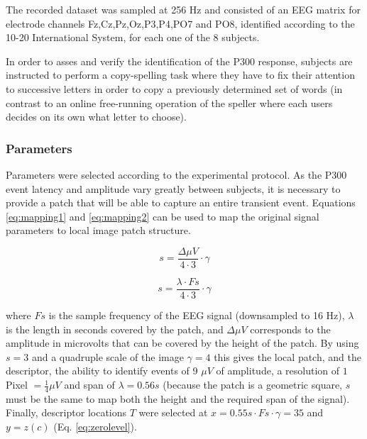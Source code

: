 \documentclass[entropy,article,submit,moreauthors,pdftex,10pt,a4paper]{mdpi}
\begin{document}
The recorded dataset was sampled at 256 Hz and consisted of an EEG matrix for electrode channels Fz,Cz,Pz,Oz,P3,P4,PO7 and PO8, identified according to the 10-20 International System,  for each one of the 8 subjects.  

In order to asses and verify the identification of the P300 response, subjects are instructed to perform a copy-spelling task where they have to fix their attention to successive letters in order to copy a previously determined set of words (in contrast to an online free-running operation of the speller where each users decides on its own what letter to choose).

\subsubsection{Parameters}

Parameters were selected according to the experimental protocol. As the P300 event latency and amplitude vary greatly between subjects, it is necessary to provide a patch that will be able to capture an entire transient event.  Equations \ref{eq:mapping1} and \ref{eq:mapping2} can be used to map the original signal parameters to local image patch structure. 

\begin{equation}
s= \frac{\Delta \mu V}{4 \cdot 3} \cdot \gamma 
\label{eq:mapping1}
\end{equation}

\begin{equation}
s = \frac{\lambda \cdot Fs}{4 \cdot 3} \cdot \gamma
\label{eq:mapping2}
\end{equation}

\noindent where $ Fs $ is the sample frequency of the EEG signal (downsampled to 16 Hz), $ \lambda $ is the length in seconds covered by the patch, and $\Delta  \mu V $ corresponds to the amplitude in microvolts that can be covered by the height of the patch. By using $ s = 3 $ and a quadruple scale of the image $ \gamma = 4 $ this gives the local patch, and the descriptor, the ability to identify events of 9 $ \mu V $ of amplitude, a resolution of $ 1 $ Pixel $ = \frac{1}{4} \mu V $ and span   of $ \lambda = 0.56 s $ (because the patch is a geometric square, $ s $ must be the same to map both the height and the required span of the signal).  Finally, descriptor locations $ T $ were selected at $ x =  0.55 s \cdot Fs \cdot \gamma = 35 $ and $ y = z(c) $ (Eq. \ref{eq:zerolevel}).
\end{document}
